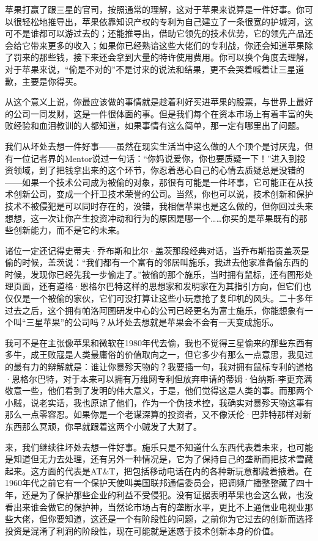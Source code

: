 苹果打赢了跟三星的官司，按照通常的理解，这对于苹果来说算是一件好事。你可以很轻松地推导出，苹果依靠知识产权的专利为自己建立了一条很宽的护城河，这可不是谁都可以游过去的；还能推导出，借助它领先的技术优势，它的领先产品还会给它带来更多的收入；如果你已经熟谙这些大佬们的专利战，你还会知道苹果除了罚来的那些钱，接下来还会拿到大量的特许使用费用。你可以换个角度去理解，对于苹果来说，``偷是不对的''不是讨来的说法和结果，更不会哭着喊着让三星道歉，主要是你得买。

从这个意义上说，你最应该做的事情就是趁着利好买进苹果的股票，与世界上最好的公司一同发财，这是一件很体面的事。但是我们每个在资本市场上有着丰富的失败经验和血泪教训的人都知道，如果事情有这么简单，那一定有哪里出了问题。

我们从坏处去想一件好事------虽然在现实生活当中这么做的人个顶个是讨厌鬼，但有一位记者界的Mentor说过一句话：``你妈说爱你，你也要质疑一下！''进入到投资领域，到了把钱拿出来的这个环节，你忍着恶心自己的心情去质疑总是没错的------如果一个技术公司成为被偷的对象，那很有可能是一件坏事，它可能正在从技术创新公司，变成一个扞卫技术荣誉的公司。当然，你也可以说，技术创新和保护技术不被侵犯是可以同时存在的，没错，我相信苹果也是这么做的，但你回过头来想想，这一次让你产生投资冲动和行为的原因是哪一个\ldots\ldots 你买的是苹果既有的那些创新能力，而不是它的未来。

诸位一定还记得史蒂夫·乔布斯和比尔·盖茨那段经典对话，当乔布斯指责盖茨是偷的时候，盖茨说：``我们都有一个富有的邻居叫施乐，我进去他家准备偷东西的时候，发现你已经先我一步偷走了。''被偷的那个施乐，当时拥有鼠标，还有图形处理页面，还有道格·恩格尔巴特这样的思想家和发明家在为其指引方向，但它们也仅仅是一个被偷的家伙，它们可没打算让这些小玩意抢了复印机的风头。二十多年过去之后，这个拥有帕洛阿图研发中心的公司已经更名为富士施乐，你能想象有一个叫``三星苹果''的公司吗？从坏处去想就是苹果会不会有一天变成施乐。

我可不是在主张像苹果和微软在1980年代去偷，我也不觉得三星偷来的那些东西有多牛，成王败寇是人类最庸俗的价值取向之一，但它多少有那么一点意思，我见过的最有力的辩解就是：谁让你暴殄天物的？我要插一句，我对拥有鼠标专利的道格·恩格尔巴特，对于本来可以拥有万维网专利但放弃申请的蒂姆·伯纳斯-李更充满敬意一些，他们看到了发明的伟大意义，于是，他们觉得这是人类的事。而那两个小贼，说老实话，我也原谅了他们，作为一个伪技术控，我确实对暴殄天物这事有那么一点零容忍。如果你是一个老谋深算的投资者，又不像沃伦·巴菲特那样对新东西那么冥顽，你早就跟着这两个小贼发了大财了。

来，我们继续往坏处去想一件好事。施乐只是不知道什么东西代表着未来，也可能是知道但无力去处理，还有另外一种情况是，它为了保持自己的垄断而把技术雪藏起来。这方面的代表是AT\&T，把包括移动电话在内的各种新玩意都藏着掖着。在1960年代之前它有一个保护天使叫美国联邦通信委员会，把调频广播整整藏了四十年，还是为了保护那些企业的利益不受侵犯。没有证据表明苹果也会这么做，也没看出来谁会做它的保护神，当然论市场占有的垄断水平，更比不上通信业电视业那些大佬，但你要知道，这还是一个有阶段性的问题，之前你为它过去的创新而选择投资是混淆了利润的阶段性，现在可能就是迷惑于技术创新本身的价值。

